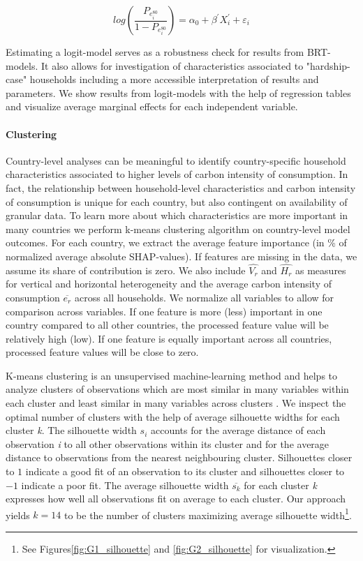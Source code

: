 \documentclass[12pt, a4paper]{article}
\begin{document}
\begin{equation}
    log \left( \frac{P_{e_{i}^{80}}}{1 - P_{e_{i}^{80}}} \right) = \alpha_{0} + \beta^{'} X_{i}^{'} + \varepsilon_{i}
\end{equation}

Estimating a logit-model serves as a robustness check for results from BRT-models. It also allows for investigation of characteristics associated to "hardship-case" households including a more accessible interpretation of results and parameters. We show results from logit-models with the help of regression tables and visualize average marginal effects for each independent variable.

\paragraph{Clustering} Country-level analyses can be meaningful to identify country-specific household characteristics associated to higher levels of carbon intensity of consumption. In fact, the relationship between household-level characteristics and carbon intensity of consumption is unique for each country, but also contingent on availability of granular data. To learn more about which characteristics are more important in many countries we perform k-means clustering algorithm on country-level model outcomes. For each country, we extract the average feature importance (in \% of normalized average absolute SHAP-values). If features are missing in the data, we assume its share of contribution is zero. We also include $\widehat{V_{r}}$ and $\widehat{H_{r}}$ as measures for vertical and horizontal heterogeneity and the average carbon intensity of consumption $\overline{e_{r}}$ across all households. We normalize all variables to allow for comparison across variables. If one feature is more (less) important in one country compared to all other countries, the processed feature value will be relatively high (low). If one feature is equally important across all countries, processed feature values will be close to zero.

K-means clustering is an unsupervised machine-learning method and helps to analyze clusters of observations which are most similar in many variables within each cluster and least similar in many variables across clusters \autocite{MacQueen.1967}. We inspect the optimal number of clusters with the help of average silhouette widths \autocite{Rousseeuw.1987} for each cluster \textit{k}. The silhouette width $s_{i}$ accounts for the average distance of each observation \textit{i} to all other observations within its cluster and for the average distance to observations from the nearest neighbouring cluster. Silhouettes closer to $1$ indicate a good fit of an observation to its cluster and silhouettes closer to $-1$ indicate a poor fit. The average silhouette width $\overline{s_{k}}$ for each cluster \textit{k} expresses how well all observations fit on average to each cluster. Our approach yields $k = 14$ to be the number of clusters maximizing average silhouette width\footnote{See Figures\ref{fig:G1_silhouette} and \ref{fig:G2_silhouette} for visualization.}.
\end{document}
